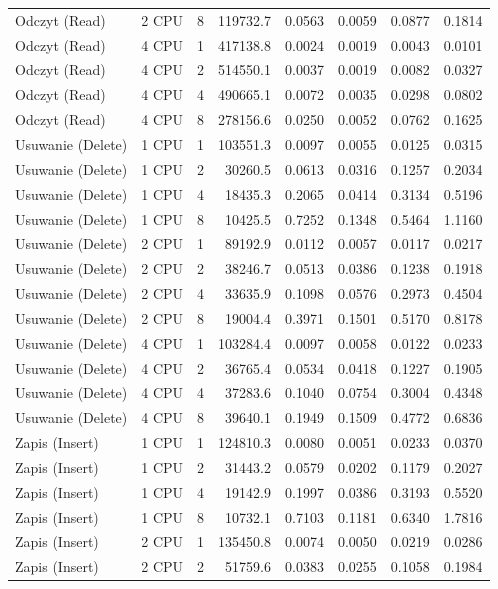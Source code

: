 \begin{table}[ht]
{\begin{tabular}{llcrrrrr}
Odczyt (Read) & 2 CPU & 8 & 119732.7 & 0.0563 & 0.0059 & 0.0877 & 0.1814 \\
Odczyt (Read) & 4 CPU & 1 & 417138.8 & 0.0024 & 0.0019 & 0.0043 & 0.0101 \\
Odczyt (Read) & 4 CPU & 2 & 514550.1 & 0.0037 & 0.0019 & 0.0082 & 0.0327 \\
Odczyt (Read) & 4 CPU & 4 & 490665.1 & 0.0072 & 0.0035 & 0.0298 & 0.0802 \\
Odczyt (Read) & 4 CPU & 8 & 278156.6 & 0.0250 & 0.0052 & 0.0762 & 0.1625 \\
Usuwanie (Delete) & 1 CPU & 1 & 103551.3 & 0.0097 & 0.0055 & 0.0125 & 0.0315 \\
Usuwanie (Delete) & 1 CPU & 2 & 30260.5 & 0.0613 & 0.0316 & 0.1257 & 0.2034 \\
Usuwanie (Delete) & 1 CPU & 4 & 18435.3 & 0.2065 & 0.0414 & 0.3134 & 0.5196 \\
Usuwanie (Delete) & 1 CPU & 8 & 10425.5 & 0.7252 & 0.1348 & 0.5464 & 1.1160 \\
Usuwanie (Delete) & 2 CPU & 1 & 89192.9 & 0.0112 & 0.0057 & 0.0117 & 0.0217 \\
Usuwanie (Delete) & 2 CPU & 2 & 38246.7 & 0.0513 & 0.0386 & 0.1238 & 0.1918 \\
Usuwanie (Delete) & 2 CPU & 4 & 33635.9 & 0.1098 & 0.0576 & 0.2973 & 0.4504 \\
Usuwanie (Delete) & 2 CPU & 8 & 19004.4 & 0.3971 & 0.1501 & 0.5170 & 0.8178 \\
Usuwanie (Delete) & 4 CPU & 1 & 103284.4 & 0.0097 & 0.0058 & 0.0122 & 0.0233 \\
Usuwanie (Delete) & 4 CPU & 2 & 36765.4 & 0.0534 & 0.0418 & 0.1227 & 0.1905 \\
Usuwanie (Delete) & 4 CPU & 4 & 37283.6 & 0.1040 & 0.0754 & 0.3004 & 0.4348 \\
Usuwanie (Delete) & 4 CPU & 8 & 39640.1 & 0.1949 & 0.1509 & 0.4772 & 0.6836 \\
Zapis (Insert) & 1 CPU & 1 & 124810.3 & 0.0080 & 0.0051 & 0.0233 & 0.0370 \\
Zapis (Insert) & 1 CPU & 2 & 31443.2 & 0.0579 & 0.0202 & 0.1179 & 0.2027 \\
Zapis (Insert) & 1 CPU & 4 & 19142.9 & 0.1997 & 0.0386 & 0.3193 & 0.5520 \\
Zapis (Insert) & 1 CPU & 8 & 10732.1 & 0.7103 & 0.1181 & 0.6340 & 1.7816 \\
Zapis (Insert) & 2 CPU & 1 & 135450.8 & 0.0074 & 0.0050 & 0.0219 & 0.0286 \\
Zapis (Insert) & 2 CPU & 2 & 51759.6 & 0.0383 & 0.0255 & 0.1058 & 0.1984 \\

\end{tabular}}
\end{table}
